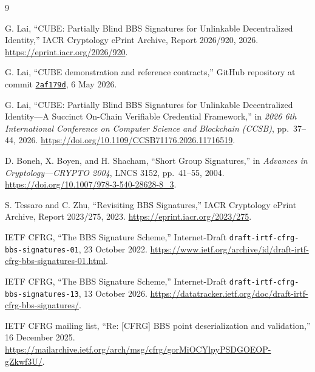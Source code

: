 \documentclass[10pt,a4paper]{article}
\begin{document}
\begin{thebibliography}{9}

G. Lai,
``CUBE: Partially Blind BBS Signatures for Unlinkable Decentralized
Identity,'' IACR Cryptology ePrint Archive, Report 2026/920, 2026.
\url{https://eprint.iacr.org/2026/920}.

G. Lai,
``CUBE demonstration and reference contracts,'' GitHub repository at commit
\href{https://github.com/LetsVerify/demo_v2/commit/2af179dc02692c188c51125a3a6d98cf8f67faef}{\texttt{2af179d}},
6 May 2026.

G. Lai,
``CUBE: Partially Blind BBS Signatures for Unlinkable Decentralized
Identity---A Succinct On-Chain Verifiable Credential Framework,'' in
\emph{2026 6th International Conference on Computer Science and Blockchain
(CCSB)}, pp.~37--44, 2026.
\url{https://doi.org/10.1109/CCSB71176.2026.11716519}.

D. Boneh, X. Boyen, and H. Shacham,
``Short Group Signatures,'' in \emph{Advances in Cryptology---CRYPTO 2004},
LNCS 3152, pp.~41--55, 2004.
\url{https://doi.org/10.1007/978-3-540-28628-8_3}.

S. Tessaro and C. Zhu,
``Revisiting BBS Signatures,'' IACR Cryptology ePrint Archive,
Report 2023/275, 2023.
\url{https://eprint.iacr.org/2023/275}.

IETF CFRG,
``The BBS Signature Scheme,'' Internet-Draft
\texttt{draft-irtf-cfrg-bbs-signatures-01}, 23 October 2022.
\url{https://www.ietf.org/archive/id/draft-irtf-cfrg-bbs-signatures-01.html}.

IETF CFRG,
``The BBS Signature Scheme,'' Internet-Draft
\texttt{draft-irtf-cfrg-bbs-signatures-13}, 13 October 2026.
\url{https://datatracker.ietf.org/doc/draft-irtf-cfrg-bbs-signatures/}.

IETF CFRG mailing list,
``Re: [CFRG] BBS point deserialization and validation,'' 16 December 2025.
\url{https://mailarchive.ietf.org/arch/msg/cfrg/gorMiOCYlpyPSDGOEOP-gZkwf3U/}.

\end{thebibliography}
\end{document}
